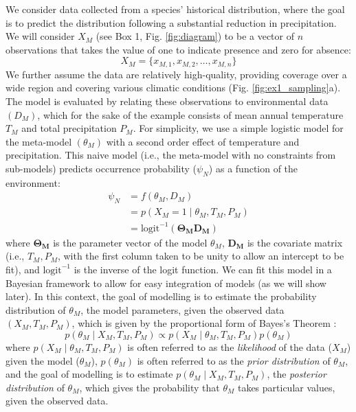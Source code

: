 We consider data collected from a species' historical distribution, where the goal is to predict the distribution following a substantial reduction in precipitation. 
We will consider \(X_M\) (see Box 1, Fig. \ref{fig:diagram}) to be a vector of $n$ observations that takes the value of one to indicate presence and zero for absence:
\begin{equation}
X_M = \{x_{M,1}, x_{M,2}, \ldots, x_{M,n}\}
\end{equation}
We further assume the data are relatively high-quality, providing coverage over a wide region and covering various climatic conditions (Fig. \ref{fig:ex1_sampling}a). 
The model is evaluated by relating these observations to environmental data \((D_M)\), which for the sake of the example consists of mean annual temperature $T_M$ and total precipitation $P_M$. 
For simplicity, we use a simple logistic model for the meta-model \((\theta_M)\) with a second order effect of temperature and precipitation. 
This naive model (i.e., the meta-model with no constraints from sub-models) predicts  occurrence probability (\(\psi_N\)) as a function of the environment:
\begin{equation}
\begin{aligned}
	\psi_N &= f\left(\theta_M, D_M \right) \\
	&= p \left (X_M = 1 \mid \theta_M, T_M, P_M \right) \\
	&=\text{logit}^{-1}\left( \mathbf{\Theta_M} \mathbf{D_M} \right)
\end{aligned}
\end{equation}
where \(\mathbf{\Theta_M}\) is the parameter vector of the model \(\theta_M\), \(\mathbf{D_M} \) is the covariate matrix (i.e., \(T_M, P_M\), with the first column taken to be unity to allow an intercept to be fit), and \(\text{logit}^{-1}\) is the inverse of the logit function.
We can fit this model in a Bayesian framework to allow for easy integration of models (as we will show later).
In this context, the goal of modelling is to estimate the probability distribution of \(\theta_M\), the model parameters, given the observed data \((X_M, T_M, P_M)\), which is given by the proportional form of Bayes's Theorem \citep[for readers unfamiliar with general concepts in Bayesian inference, we recommend][for a concise introduction]{Link2010}:
\begin{equation}
\label{eq:ex1_bayes}
	p\left (\theta_M \mid X_M,T_M,P_M \right ) \propto 
	p \left(X_M \mid \theta_M, T_M, P_M \right)
	p \left(\theta_M \right)
\end{equation}
where \(p\left(X_M \mid \theta_M, T_M, P_M \right)\) is often referred to as the \emph{likelihood} of the data (\(X_M\)) given the model (\(\theta_M\)), \(p\left(\theta_M \right)\) is often referred to as the \emph{prior distribution} of \(\theta_M\), and the goal of modelling is to estimate \(p\left (\theta_M \mid X_M,T_M,P_M \right )\), the \emph{posterior distribution} of \(\theta_M\), which gives the probability that \(\theta_M\) takes particular values, given the observed data.

